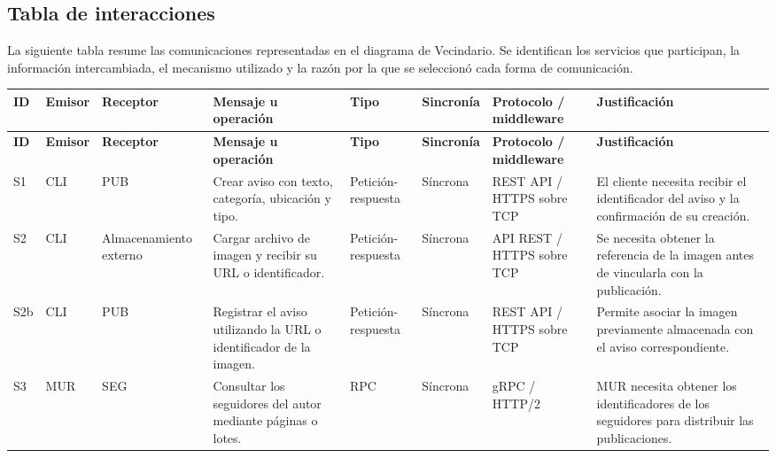 \documentclass[12pt,a4paper]{article}
\begin{document}
\begin{landscape}

\section{Tabla de interacciones}

La siguiente tabla resume las comunicaciones representadas
en el diagrama de Vecindario. Se identifican los servicios
que participan, la información intercambiada, el mecanismo
utilizado y la razón por la que se seleccionó cada forma
de comunicación.
\small
\setlength{\tabcolsep}{4pt}
\renewcommand{\arraystretch}{1.3}

\begin{longtable}{
|p{0.7cm}
|p{2.1cm}
|p{2.1cm}
|p{3.5cm}
|p{1.7cm}
|p{1.7cm}
|p{2.8cm}
|p{5.0cm}|}

\hline
\textbf{ID} &
\textbf{Emisor} &
\textbf{Receptor} &
\textbf{Mensaje u operación} &
\textbf{Tipo} &
\textbf{Sincronía} &
\textbf{Protocolo / middleware} &
\textbf{Justificación} \\
\hline
\endfirsthead

\hline
\textbf{ID} &
\textbf{Emisor} &
\textbf{Receptor} &
\textbf{Mensaje u operación} &
\textbf{Tipo} &
\textbf{Sincronía} &
\textbf{Protocolo / middleware} &
\textbf{Justificación} \\
\hline
\endhead

S1 & CLI & PUB &
Crear aviso con texto, categoría, ubicación y tipo. &
Petición-respuesta & Síncrona &
REST API / HTTPS sobre TCP &
El cliente necesita recibir el identificador del aviso y la confirmación de su creación. \\
\hline

S2 & CLI & Almacenamiento externo &
Cargar archivo de imagen y recibir su URL o identificador. &
Petición-respuesta & Síncrona &
API REST / HTTPS sobre TCP &
Se necesita obtener la referencia de la imagen antes de vincularla con la publicación. \\
\hline

S2b & CLI & PUB &
Registrar el aviso utilizando la URL o identificador de la imagen. &
Petición-respuesta & Síncrona &
REST API / HTTPS sobre TCP &
Permite asociar la imagen previamente almacenada con el aviso correspondiente. \\
\hline

S3 & MUR & SEG &
Consultar los seguidores del autor mediante páginas o lotes. &
RPC & Síncrona &
gRPC / HTTP/2 &
MUR necesita obtener los identificadores de los seguidores para distribuir las publicaciones. \\
\hline


\end{longtable}
\end{landscape}
\end{document}
